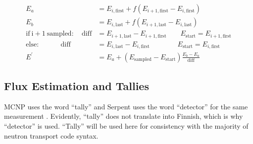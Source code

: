 \begin{equation}
\label{energy_scaling}
\begin{split}
E_a &= E_{i,\mathrm{first}} +  f( E_{i+1,\mathrm{first}} - E_{i,\mathrm{first}} ) \\
E_b &= E_{i,\mathrm{last}} +  f( E_{i+1,\mathrm{last}} - E_{i,\mathrm{last}} ) \\
\mathrm{if\:i+1\:sampled:} \quad \mathrm{diff} &= E_{i+1,\mathrm{last}}  - E_{i+1,\mathrm{first}}  \qquad E_\mathrm{start}= E_{i+1,\mathrm{first}}  \\
\mathrm{else:}          \qquad \quad       \mathrm{diff} &= E_{i,\mathrm{last}}  - E_{i,\mathrm{first}}  \qquad \qquad E_\mathrm{start}= E_{i,\mathrm{first}}  \\
E^\prime &=  E_a  +  ( E_\mathrm{sampled} - E_\mathrm{start})  \frac{ E_b - E_a}{ \mathrm{diff} }  
\end{split}
\end{equation}%


\subsection{Flux Estimation and Tallies}


MCNP uses the word ``tally'' and Serpent uses the word ``detector'' for the same measurement \cite{serpent,mcnp}.  Evidently, ``tally'' does not translate into Finnish, which is why ``detector'' is used.  ``Tally'' will be used here for consistency with the majority of neutron transport code syntax.  

